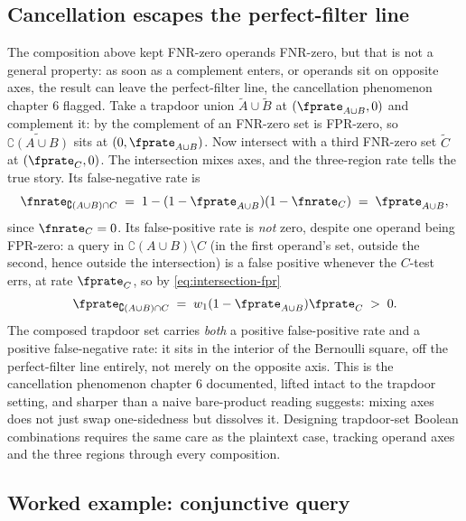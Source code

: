 \subsection*{Cancellation escapes the perfect-filter line}

The composition above kept FNR-zero operands FNR-zero, but that is not a
general property: as soon as a complement enters, or operands sit on
opposite axes, the result can leave the perfect-filter line, the
cancellation phenomenon chapter 6  flagged. Take a
trapdoor union $\tilde A \cup \tilde B$ at $(\fprate_{A \cup B}, 0)$ and
complement it: by  the complement of an
FNR-zero set is FPR-zero, so $\tilde{\complement(A \cup B)}$ sits at $(0,
\fprate_{A \cup B})$. Now intersect with a third FNR-zero set $\tilde C$
at $(\fprate_C, 0)$. The intersection mixes axes, and the three-region
rate tells the true story. Its false-negative rate is
\[
  \fnrate_{\complement(A \cup B) \cap C}
  \;=\; 1 - (1 - \fprate_{A \cup B})(1 - \fnrate_C)
  \;=\; \fprate_{A \cup B},
\]
since $\fnrate_C = 0$. Its false-positive rate is \emph{not} zero, despite
one operand being FPR-zero: a query in $\complement(A \cup B) \setminus C$
(in the first operand's set, outside the second, hence outside the
intersection) is a false positive whenever the $C$-test errs, at rate
$\fprate_C$, so by \eqref{eq:intersection-fpr}
\[
  \fprate_{\complement(A \cup B) \cap C}
  \;=\; w_1 (1 - \fprate_{A \cup B}) \fprate_C \;>\; 0.
\]
The composed trapdoor set carries \emph{both} a positive false-positive
rate and a positive false-negative rate: it sits in the interior of the
Bernoulli square, off the perfect-filter line entirely, not merely on the
opposite axis. This is the cancellation phenomenon chapter 6 documented,
lifted intact to the trapdoor setting, and sharper than a naive
bare-product reading suggests: mixing axes does not just swap one-sidedness
but dissolves it. Designing trapdoor-set Boolean combinations requires the
same care as the plaintext case, tracking operand axes and the three
regions through every composition.

\subsection*{Worked example: conjunctive query}

